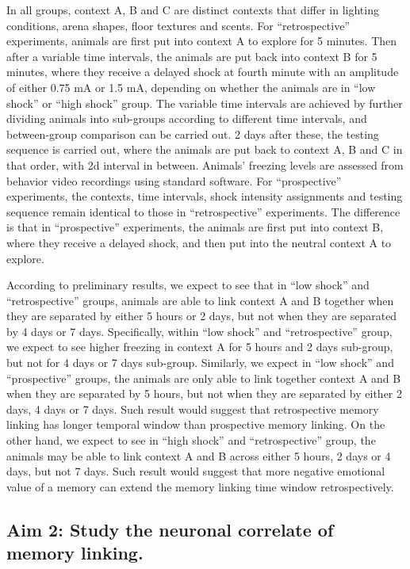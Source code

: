 \documentclass[master.tex]{subfiles}
\begin{document}
In all groups, context A, B and C are distinct contexts that differ in lighting
conditions, arena shapes, floor textures and scents. For ``retrospective''
experiments, animals are first put into context A to explore for 5 minutes. Then
after a variable time intervals, the animals are put back into context B for 5
minutes, where they receive a delayed shock at fourth minute with an amplitude
of either 0.75 mA or 1.5 mA, depending on whether the animals are in ``low
shock'' or ``high shock'' group. The variable time intervals are achieved by
further dividing animals into sub-groups according to different time intervals,
and between-group comparison can be carried out. 2 days after these, the testing
sequence is carried out, where the animals are put back to context A, B and C in
that order, with 2d interval in between. Animals' freezing levels are assessed
from behavior video recordings using standard software. For ``prospective''
experiments, the contexts, time intervals, shock intensity assignments and
testing sequence remain identical to those in ``retrospective'' experiments. The
difference is that in ``prospective'' experiments, the animals are first put
into context B, where they receive a delayed shock, and then put into the
neutral context A to explore.

According to preliminary results, we expect to see that in ``low shock'' and
``retrospective'' groups, animals are able to link context A and B together when
they are separated by either 5 hours or 2 days, but not when they are separated
by 4 days or 7 days. Specifically, within ``low shock'' and ``retrospective''
group, we expect to see higher freezing in context A for 5 hours and 2 days
sub-group, but not for 4 days or 7 days sub-group. Similarly, we expect in ``low
shock'' and ``prospective'' groups, the animals are only able to link together
context A and B when they are separated by 5 hours, but not when they are
separated by either 2 days, 4 days or 7 days. Such result would suggest that
retrospective memory linking has longer temporal window than prospective memory
linking. On the other hand, we expect to see in ``high shock'' and
``retrospective'' group, the animals may be able to link context A and B across
either 5 hours, 2 days or 4 days, but not 7 days. Such result would suggest that
more negative emotional value of a memory can extend the memory linking time
window retrospectively.

\subsection*{Aim 2: Study the neuronal correlate of memory linking.}
\end{document}
